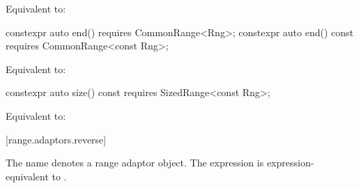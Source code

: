 {\begin{itemdescr}
\pnum
\effects Equivalent to: 
\end{itemdescr}

%
\begin{itemdecl}
constexpr auto end() requires CommonRange<Rng>;
constexpr auto end() const requires CommonRange<const Rng>;
\end{itemdecl}

\begin{itemdescr}
\pnum
\effects Equivalent to: 
\end{itemdescr}

%
\begin{itemdecl}
constexpr auto size() const requires SizedRange<const Rng>;
\end{itemdecl}

\begin{itemdescr}
\pnum
\effects Equivalent to: 
\end{itemdescr}

[range.adaptors.reverse]{}

\pnum
The name  denotes a range adaptor
object.  The expression
  is
expression-equivalent to  .
} %
